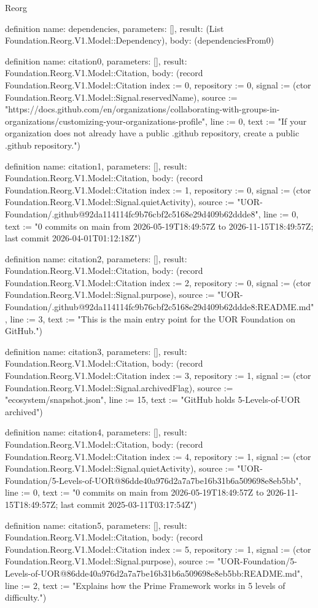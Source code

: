 \begin{lexlean}{Reorg}
\begin{semanticmodule}
definition{
  name: dependencies,
  parameters: [],
  result: (List Foundation.Reorg.V1.Model::Dependency),
  body: (dependenciesFrom0)
}

definition{
  name: citation0,
  parameters: [],
  result: Foundation.Reorg.V1.Model::Citation,
  body: (record Foundation.Reorg.V1.Model::Citation {index := 0, repository := 0, signal := (ctor Foundation.Reorg.V1.Model::Signal.reservedName), source := "https://docs.github.com/en/organizations/collaborating-with-groups-in-organizations/customizing-your-organizations-profile", line := 0, text := "If your organization does not already have a public .github repository, create a public .github repository."})
}

definition{
  name: citation1,
  parameters: [],
  result: Foundation.Reorg.V1.Model::Citation,
  body: (record Foundation.Reorg.V1.Model::Citation {index := 1, repository := 0, signal := (ctor Foundation.Reorg.V1.Model::Signal.quietActivity), source := "UOR-Foundation/.github@92da114114fc9b76cbf2c5168e29d409b62ddde8", line := 0, text := "0 commits on main from 2026-05-19T18:49:57Z to 2026-11-15T18:49:57Z; last commit 2026-04-01T01:12:18Z"})
}

definition{
  name: citation2,
  parameters: [],
  result: Foundation.Reorg.V1.Model::Citation,
  body: (record Foundation.Reorg.V1.Model::Citation {index := 2, repository := 0, signal := (ctor Foundation.Reorg.V1.Model::Signal.purpose), source := "UOR-Foundation/.github@92da114114fc9b76cbf2c5168e29d409b62ddde8:README.md", line := 3, text := "This is the main entry point for the UOR Foundation on GitHub."})
}

definition{
  name: citation3,
  parameters: [],
  result: Foundation.Reorg.V1.Model::Citation,
  body: (record Foundation.Reorg.V1.Model::Citation {index := 3, repository := 1, signal := (ctor Foundation.Reorg.V1.Model::Signal.archivedFlag), source := "ecosystem/snapshot.json", line := 15, text := "GitHub holds 5-Levels-of-UOR archived"})
}

definition{
  name: citation4,
  parameters: [],
  result: Foundation.Reorg.V1.Model::Citation,
  body: (record Foundation.Reorg.V1.Model::Citation {index := 4, repository := 1, signal := (ctor Foundation.Reorg.V1.Model::Signal.quietActivity), source := "UOR-Foundation/5-Levels-of-UOR@86dde40a976d2a7a7be16b31b6a509698e8eb5bb", line := 0, text := "0 commits on main from 2026-05-19T18:49:57Z to 2026-11-15T18:49:57Z; last commit 2025-03-11T03:17:54Z"})
}

definition{
  name: citation5,
  parameters: [],
  result: Foundation.Reorg.V1.Model::Citation,
  body: (record Foundation.Reorg.V1.Model::Citation {index := 5, repository := 1, signal := (ctor Foundation.Reorg.V1.Model::Signal.purpose), source := "UOR-Foundation/5-Levels-of-UOR@86dde40a976d2a7a7be16b31b6a509698e8eb5bb:README.md", line := 2, text := "Explains how the Prime Framework works in 5 levels of difficulty."})
}


\end{semanticmodule}
\end{lexlean}
